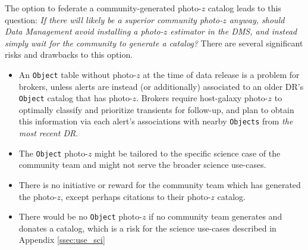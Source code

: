 \documentclass[DM,lsstdraft,toc]{lsstdoc}
\begin{document}
The option to federate a community-generated photo-$z$ catalog leads to this question: {\it If there will likely be a superior community photo-$z$ anyway, should Data Management avoid installing a photo-$z$ estimator in the DMS, and instead simply wait for the community to generate a catalog?}
There are several significant risks and drawbacks to this option.
\vspace{-15pt}
\begin{itemize}
\item An {\tt Object} table without photo-$z$ at the time of data release is a problem for brokers, unless alerts are instead (or additionally) associated to an older DR's {\tt Object} catalog that has photo-$z$. Brokers require host-galaxy photo-$z$ to optimally classify and prioritize transients for follow-up, and plan to obtain this information via each alert's associations with nearby {\tt Objects} from {\it the most recent DR}.
\item The {\tt Object} photo-$z$ might be tailored to the specific science case of the community team and might not serve the broader science use-cases.
\item There is no initiative or reward for the community team which has generated the photo-$z$, except perhaps citations to their photo-$z$ catalog.
\item There would be no {\tt Object} photo-$z$ if no community team generates and donates a catalog, which is a risk for the science use-cases described in Appendix \ref{ssec:use_sci}
\end{itemize}
\end{document}

